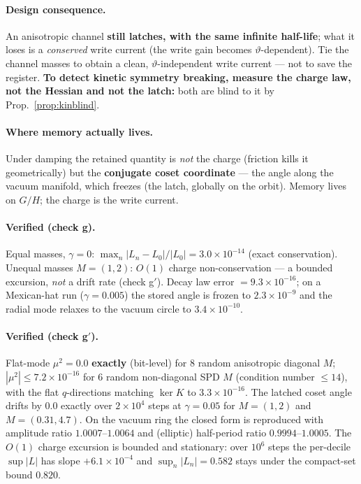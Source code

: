 \documentclass[11pt]{article}
\theoremstyle{plain}
\theoremstyle{definition}
\begin{document}
\paragraph{Design consequence.} An anisotropic channel \textbf{still latches, with the same infinite half-life}; what it loses is a \emph{conserved} write current (the write gain becomes $\vartheta$-dependent). Tie the channel masses to obtain a clean, $\vartheta$-independent write current --- not to save the register. \textbf{To detect kinetic symmetry breaking, measure the charge law, not the Hessian and not the latch:} both are blind to it by Prop.~\ref{prop:kinblind}.

\paragraph{Where memory actually lives.} Under damping the retained quantity is \emph{not} the charge (friction kills it geometrically) but the \textbf{conjugate coset coordinate} --- the angle along the vacuum manifold, which freezes (the latch, globally on the orbit). Memory lives on $G/H$; the charge is the write current.

\paragraph{Verified (check g).} Equal masses, $\gamma=0$: $\max_n|L_n-L_0|/|L_0|=3.0\times10^{-14}$ (exact conservation). Unequal masses $M=(1,2)$: $O(1)$ charge non-conservation --- a bounded excursion, \emph{not} a drift rate (check g$'$). Decay law error $=9.3\times10^{-16}$; on a Mexican-hat run ($\gamma=0.005$) the stored angle is frozen to $2.3\times10^{-9}$ and the radial mode relaxes to the vacuum circle to $3.4\times10^{-10}$.

\paragraph{Verified (check g$'$).} Flat-mode $\mu^2=0.0$ \textbf{exactly} (bit-level) for $8$ random anisotropic diagonal $M$; $|\mu^2|\le7.2\times10^{-16}$ for $6$ random non-diagonal SPD $M$ (condition number $\le14$), with the flat $q$-directions matching $\ker K$ to $3.3\times10^{-16}$. The latched coset angle drifts by $0.0$ exactly over $2\times10^4$ steps at $\gamma=0.05$ for $M=(1,2)$ and $M=(0.31,4.7)$. On the vacuum ring the closed form is reproduced with amplitude ratio $1.0007$--$1.0064$ and (elliptic) half-period ratio $0.9994$--$1.0005$. The $O(1)$ charge excursion is bounded and stationary: over $10^6$ steps the per-decile $\sup|L|$ has slope $+6.1\times10^{-4}$ and $\sup_n|L_n|=0.582$ stays under the compact-set bound $0.820$.
\end{document}
